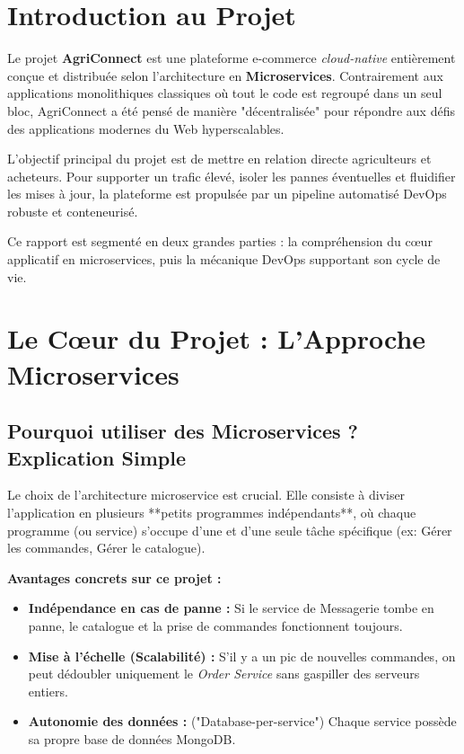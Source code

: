 \documentclass[12pt,a4paper]{article}
\begin{document}
\section{Introduction au Projet}

Le projet \textbf{AgriConnect} est une plateforme e-commerce \textit{cloud-native} entièrement conçue et distribuée selon l'architecture en \textbf{Microservices}. Contrairement aux applications monolithiques classiques où tout le code est regroupé dans un seul bloc, AgriConnect a été pensé de manière "décentralisée" pour répondre aux défis des applications modernes du Web hyperscalables.

L'objectif principal du projet est de mettre en relation directe agriculteurs et acheteurs. Pour supporter un trafic élevé, isoler les pannes éventuelles et fluidifier les mises à jour, la plateforme est propulsée par un pipeline automatisé DevOps robuste et conteneurisé. 

Ce rapport est segmenté en deux grandes parties : la compréhension du cœur applicatif en microservices, puis la mécanique DevOps supportant son cycle de vie.

\section{Le Cœur du Projet : L'Approche Microservices}

\subsection{Pourquoi utiliser des Microservices ? Explication Simple}
Le choix de l'architecture microservice est crucial. Elle consiste à diviser l'application en plusieurs **petits programmes indépendants**, où chaque programme (ou service) s'occupe d'une et d'une seule tâche spécifique (ex: Gérer les commandes, Gérer le catalogue). 

\textbf{Avantages concrets sur ce projet :}
\begin{itemize}
    \item \textbf{Indépendance en cas de panne :} Si le service de Messagerie tombe en panne, le catalogue et la prise de commandes fonctionnent toujours.
    \item \textbf{Mise à l'échelle (Scalabilité) :} S'il y a un pic de nouvelles commandes, on peut dédoubler uniquement le \textit{Order Service} sans gaspiller des serveurs entiers.
    \item \textbf{Autonomie des données :} ("Database-per-service") Chaque service possède sa propre base de données MongoDB.
\end{itemize}
\end{document}
